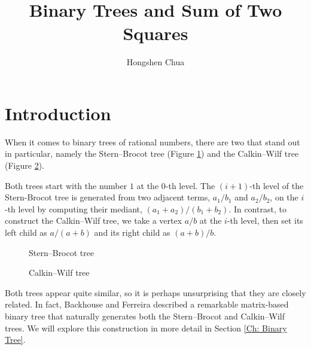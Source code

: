 \documentclass[12pt]{article}
\title{Binary Trees and Sum of Two Squares}
\author{Hongshen Chua}
\date{}
\theoremstyle{plain}
\theoremstyle{definition}
\theoremstyle{remark}
\begin{document}
	\maketitle

\section{Introduction}

When it comes to binary trees of rational numbers, there are two that stand out in particular, namely the Stern--Brocot tree (Figure \ref{Fg: Stern Brocot}) and the Calkin--Wilf tree (Figure \ref{Fg: Calkin Wilf}).

Both trees start with the number $ 1 $ at the $ 0 $-th level. The $ (i + 1) $-th level of the Stern-Brocot tree is generated from two adjacent terms, $ a_1/b_1 $ and $ a_2/b_2 $, on the $ i $-th level by computing their mediant, $ (a_1 + a_2)/(b_1 + b_2) $. In contrast, to construct the Calkin--Wilf tree, we take a vertex $ a/b $ at the $ i $-th level, then set its left child as $ a/(a + b) $ and its right child as $ (a + b)/b $.
\begin{figure}[h]
\centering
{}
\caption{Stern--Brocot tree} \label{Fg: Stern Brocot}
\end{figure}

\begin{figure}[h]
\centering
{}
\caption{Calkin--Wilf tree} \label{Fg: Calkin Wilf}
\end{figure}

Both trees appear quite similar, so it is perhaps unsurprising that they are closely related. In fact, Backhouse and Ferreira \cite{Backhouse_Ferreira} described a remarkable matrix-based binary tree that naturally generates both the Stern--Brocot and Calkin--Wilf trees. We will explore this construction in more detail in Section \ref{Ch: Binary Tree}. 
\end{document}
